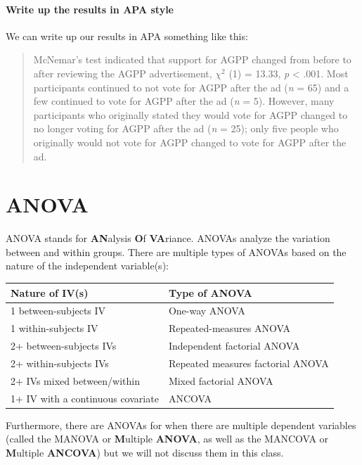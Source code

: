 \documentclass[
]{book}
\begin{document}
\hypertarget{write-up-the-results-in-apa-style-5}{%
\subsubsection{Write up the results in APA style}\label{write-up-the-results-in-apa-style-5}}

We can write up our results in APA something like this:

\begin{quote}
McNemar's test indicated that support for AGPP changed from before to after reviewing the AGPP advertisement, \(\chi^2\) (1) = 13.33, \emph{p} \textless{} .001. Most participants continued to not vote for AGPP after the ad (\emph{n} = 65) and a few continued to vote for AGPP after the ad (\emph{n} = 5). However, many participants who originally stated they would vote for AGPP changed to no longer voting for AGPP after the ad (\emph{n} = 25); only five people who originally would not vote for AGPP changed to vote for AGPP after the ad.
\end{quote}

\hypertarget{anova}{%
\chapter{ANOVA}\label{anova}}

ANOVA stands for \textbf{AN}alysis \textbf{O}f \textbf{VA}riance. ANOVAs analyze the variation between and within groups. There are multiple types of ANOVAs based on the nature of the independent variable(s):

\begin{longtable}[]{@{}ll@{}}
\toprule
\textbf{Nature of IV(s)} & \textbf{Type of ANOVA} \\
\midrule
\endhead
1 between-subjects IV & One-way ANOVA \\
1 within-subjects IV & Repeated-measures ANOVA \\
2+ between-subjects IVs & Independent factorial ANOVA \\
2+ within-subjects IVs & Repeated measures factorial ANOVA \\
2+ IVs mixed between/within & Mixed factorial ANOVA \\
1+ IV with a continuous covariate & ANCOVA \\
\bottomrule
\end{longtable}

Furthermore, there are ANOVAs for when there are multiple dependent variables (called the MANOVA or \textbf{M}ultiple \textbf{ANOVA}, as well as the MANCOVA or \textbf{M}ultiple \textbf{ANCOVA}) but we will not discuss them in this class.
\end{document}
